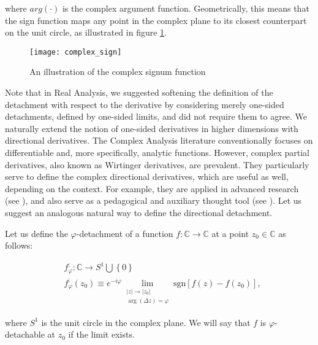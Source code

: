 \documentclass[11pt]{book}
\begin{document}
where $arg\left(\cdot\right)$ is the complex argument function. Geometrically, this means that the sign function maps any point in the complex plane to its closest counterpart on the unit circle, as illustrated in figure \ref{complex_sign_fig}.

\begin{figure}
\texttt{[image: complex\_sign]}
\caption{An illustration of the complex signum function}
\label{complex_sign_fig}
\end{figure}

Note that in Real Analysis, we suggested softening the definition of the detachment with respect to the derivative by considering merely one-sided detachments, defined by one-sided limits, and did not require them to agree. We naturally extend the notion of one-sided derivatives in higher dimensions with directional derivatives. The Complex Analysis literature conventionally focuses on differentiable and, more specifically, analytic functions. However, complex partial derivatives, also known as Wirtinger derivatives, are prevalent. They particularly serve to define the complex directional derivatives, which are useful as well, depending on the context. For example, they are applied in advanced research (see \cite{dructu2018geometric}), and also serve as a pedagogical and auxiliary thought tool (see \cite{shabat2003introduction}). Let us suggest an analogous natural way to define the directional detachment.

\begin{definition}\label{complex_detachment_definition} Let us define the $\varphi$-detachment of a function $f:\mathbb{C}\longrightarrow\mathbb{C}$ at a point $z_{0}\in\mathbb{C}$ as follows:

$$\begin{array}{ccc}
& f_{\varphi}^{;}:\mathbb{C}\longrightarrow S^{1}\bigcup\left\{ 0\right\} \\
& f_{\varphi}^{;}\left(z_{0}\right)\equiv e^{-i\varphi}\underset{\begin{array}{c}
\left|z\right|\to\left|z_{0}\right|\\
\arg\left(\Delta z\right)=\varphi
\end{array}}{\lim}\text{sgn}\left[f\left(z\right)-f\left(z_{0}\right)\right],
\end{array}$$

where $S^{1}$ is the unit circle in the complex plane. We will say that $f$ is $\varphi$-detachable at $z_{0}$ if the limit exists.
\end{definition}
\end{document}
